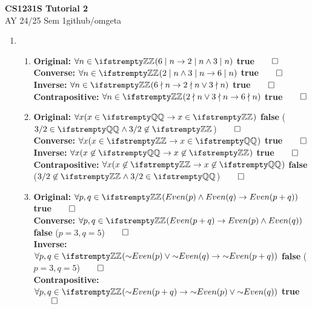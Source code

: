 \documentclass[12pt, a4paper]{article}
\newcommand{\mytitle}{CS1231S Tutorial 2}
\newcommand{\myauthor}{github/omgeta}
\newcommand{\mydate}{AY 24/25 Sem 1}
\begin{document}
\raggedright
\footnotesize
\begin{center}
{\normalsize{\textbf{\mytitle}}} \\
{\footnotesize{\mydate\hspace{2pt}\textemdash\hspace{2pt}\myauthor}}
\end{center}
\begin{enumerate}[Q\arabic*.]
  \item 
    \begin{enumerate}[(\alph*)]
      \item  \textbf{Original: }$\forall n \in \ZZ (6\mid  n \rightarrow 2\mid n \land 3\mid  n)$\textbf{ true}$\qed$\\
        \textbf{Converse:} $\forall n \in \ZZ (2\mid n \land 3\mid n \rightarrow 6\mid n)$\textbf{ true}$\qed$\\
        \textbf{Inverse:} $\forall n \in \ZZ (6\nmid n \rightarrow 2\nmid n \lor 3 \nmid n)$\textbf{ true}$\qed$\\
        \textbf{Contrapositive:} $\forall n \in \ZZ (2\nmid n \lor 3\nmid  n \rightarrow 6 \nmid n)$\textbf{ true}$\qed$\\

      \item  \textbf{Original: }$\forall x (x \in \QQ \rightarrow x \in \ZZ)$\textbf{ false} ($3/2 \in \QQ \land 3/2 \not\in \ZZ$)$\qed$\\
        \textbf{Converse:} $\forall x (x \in \ZZ \rightarrow x \in \QQ)$\textbf{ true}$\qed$\\
        \textbf{Inverse:} $\forall x (x \not\in \QQ \rightarrow x \not\in \ZZ)$\textbf{ true}$\qed$\\
        \textbf{Contrapositive:} $\forall x (x \not\in \ZZ \rightarrow x \not\in \QQ)$\textbf{ false} ($3/2 \not\in \ZZ \land 3/2 \in \QQ$)$\qed$\\
      
      \item  \textbf{Original: }$\forall p,q\in\ZZ (Even(p)\land Even(q) \rightarrow Even(p+q))$\textbf{ true}$\qed$\\
        \textbf{Converse:} $\forall p,q\in\ZZ (Even(p+q)\rightarrow Even(p) \land Even(q))$\textbf{ false} ($p=3,q=5$)$\qed$\\
        \textbf{Inverse:} $\forall p,q\in\ZZ (\neg Even(p) \lor \neg Even(q) \rightarrow \neg Even(p+q))$\textbf{ false} ($p=3,q=5$)$\qed$\\
        \textbf{Contrapositive:} $\forall p,q\in\ZZ (\neg Even(p+q) \rightarrow \neg Even(p) \lor \neg Even(q))$\textbf{ true}$\qed$\\
    \end{enumerate}
  

\end{enumerate}
\end{document}

